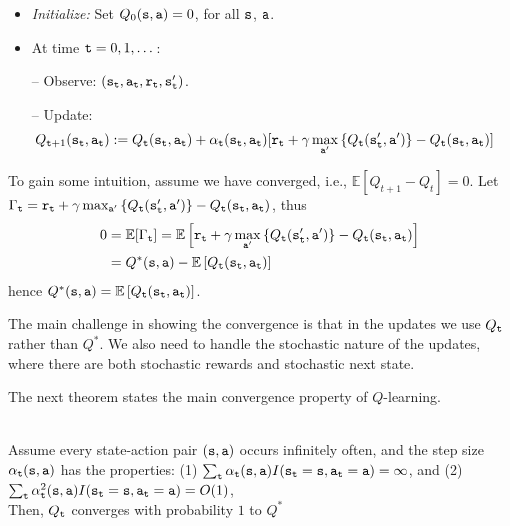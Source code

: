\begin{itemize}
\item {\em Initialize:} Set $ Q_0({\tt s},{\tt a})=0$, for all ${\tt s}$, ${\tt a}$.

\item At time ${\tt t}=0,1,\dots$:

-- Observe: $({\tt s}_{\tt t}, {\tt a}_{\tt t}, {\tt r}_{\tt t},
{\tt s}_{{\tt t}}')$.

-- Update: %
\begin{align*}
 Q_{{\tt t}+1}({\tt s}_{\tt t},{\tt a}_{\tt t}) & :=
 Q_{\tt t} ({\tt s}_{\tt t},{\tt a}_{\tt t}) + \alpha_{\tt t}({\tt s}_{\tt t},{\tt a}_{\tt t})  [{\tt r}_{\tt t} +
\gamma \max_{{\tt a}'} \left\{Q_{\tt t} ({\tt s}_{{\tt t}}', {\tt a}')\right\}
-Q_{\tt t} ({\tt s}_{\tt t},{\tt a}_{\tt t})]
\end{align*}
\end{itemize}
To gain some intuition, assume we have converged, i.e., $\mathbb{E}\left[Q_{t+1}-Q_{t}\right]=0$.
Let $\Gamma_{{\tt t}}={\tt r}_{{\tt t}}+\gamma\max_{{\tt a}'}\left\{ Q_{{\tt t}}({\tt s}_{{\tt t}}',{\tt a}')\right\} -Q_{{\tt t}}({\tt s}_{{\tt t}},{\tt a}_{{\tt t}})$, thus 
\begin{align*}
	0 & =\mathbb{E}[\Gamma_{{\tt t}}]=\mathbb{E}\left[{\tt r}_{{\tt t}}+\gamma\max_{{\tt a}'}\left\{ Q_{{\tt t}}({\tt s}_{{\tt t}}',{\tt a}')\right\} -Q_{{\tt t}}({\tt s}_{{\tt t}},{\tt a}_{{\tt t}})\right]\\
	& =Q^{*}({\tt s},{\tt a})-\mathbb{E}\left[Q_{{\tt t}}({\tt s}_{{\tt t}},{\tt a}_{{\tt t}})\right]
\end{align*}
hence $Q^{*}({\tt s},{\tt a})=\mathbb{E}\left[Q_{{\tt t}}({\tt s}_{{\tt t}},{\tt a}_{{\tt t}})\right]$.

The main challenge in showing the convergence is that in the updates
we use $Q_{\tt t}$ rather than $Q^*$. We also need to handle the
stochastic nature of the updates, where there are both stochastic
rewards and stochastic next state.

The next theorem states the main convergence property of
$Q$-learning.

\begin{theorem}\ \\
\label{thm:Q-learning} Assume every state-action pair
$({\tt s},{\tt a})$ occurs infinitely often, and the step size
$\alpha_{\tt t}({\tt s},{\tt a})$ has the properties: (1) $\sum_{\tt t}
\alpha_{\tt t}({\tt s},{\tt a})
I({\tt s}_{\tt t}={\tt s},{\tt a}_{\tt t}={\tt a})=\infty $, and (2)
$\sum_{\tt t}
\alpha_{\tt t}^2({\tt s},{\tt a}) I({\tt s}_{\tt t}={\tt s},{\tt a}_{\tt t}={\tt a})=O(1)$,\\
Then, $Q_{\tt t}$ converges with probability $1$ to $Q^*$
\end{theorem}

